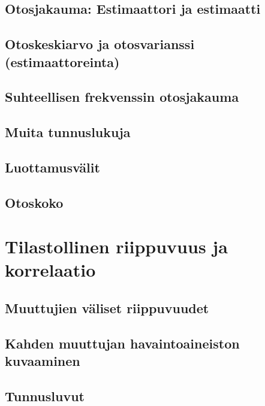\documentclass[
]{book}
\begin{document}
\hypertarget{alaluku62}{%
\section{Otosjakauma: Estimaattori ja estimaatti}\label{alaluku62}}

\hypertarget{alaluku63}{%
\section{Otoskeskiarvo ja otosvarianssi (estimaattoreinta)}\label{alaluku63}}

\hypertarget{alaluku64}{%
\section{Suhteellisen frekvenssin otosjakauma}\label{alaluku64}}

\hypertarget{alaluku65}{%
\section{Muita tunnuslukuja}\label{alaluku65}}

\hypertarget{alaluku66}{%
\section{Luottamusvälit}\label{alaluku66}}

\hypertarget{alaluku67}{%
\section{Otoskoko}\label{alaluku67}}

\hypertarget{luku7}{%
\chapter{Tilastollinen riippuvuus ja korrelaatio}\label{luku7}}

\hypertarget{alaluku71}{%
\section{Muuttujien väliset riippuvuudet}\label{alaluku71}}

\hypertarget{alaluku72}{%
\section{Kahden muuttujan havaintoaineiston kuvaaminen}\label{alaluku72}}

\hypertarget{alaluku73}{%
\section{Tunnusluvut}\label{alaluku73}}
\end{document}
